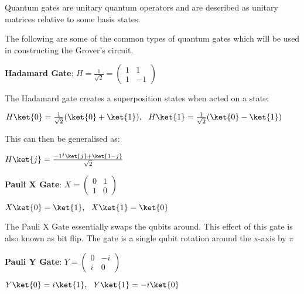\documentclass{article}
\begin{document}
Quantum gates are unitary quantum operators and are described as unitary matrices relative to some basis states.
\vspace{5mm}

\noindent
The following are some of the common types of quantum gates\cite{voorhoede_pauli-x_nodate} which will be used in constructing the Grover's circuit.
\vspace{5mm}

\textbf{Hadamard Gate}: \qquad $H = \frac{1}{\sqrt{2}}= \begin{pmatrix} 1 & 1 \\ 1 & -1 \end{pmatrix}$
\vspace{5mm}

\noindent
The Hadamard gate creates a superposition states when acted on a state:
\vspace{5mm}


\qquad $H\ket{0} = \frac{1}{\sqrt{2}} (\ket{0} + \ket{1}), \ \ H\ket{1} = \frac{1}{\sqrt{2}}(\ket{0} - \ket{1}) $
\vspace{5mm}

\noindent
This can then be generalised as:
\vspace{5mm}


\qquad $ H\ket{j} = \frac{-1^j\ket{j} + \ket{1 - j}}{\sqrt{2}} $
\vspace{5mm}


\textbf{Pauli X Gate}: \qquad $X = \begin{pmatrix} 0 & 1 \\ 1 & 0 \end{pmatrix}$
\vspace{5mm}


\qquad $X\ket{0} = \ket{1} , \ \ X\ket{1} = \ket{0}$
\vspace{5mm}

\noindent
The Pauli X Gate essentially swaps the qubits around. This effect of this gate is also known as bit flip. The gate is a single qubit rotation around the x-axis by $\pi$
\vspace{5mm}


\textbf{Pauli Y Gate}: \qquad $Y = \begin{pmatrix} 0 & -i \\ i & 0 \end{pmatrix}$
\vspace{5mm}


\qquad $Y\ket{0} = i\ket{1} , \ \ Y\ket{1} = -i\ket{0}$
\vspace{5mm}
\end{document}
